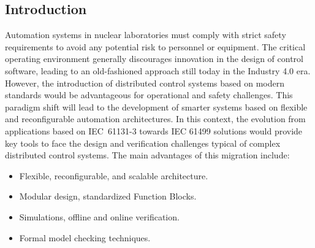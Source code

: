 \begin{bibunit}
\section{Introduction}
\label{sec:introduction}
Automation systems in nuclear laboratories must comply with strict safety requirements to avoid any potential risk to personnel or equipment.
The critical operating environment generally discourages innovation in the design of control software, leading to an old-fashioned approach still today in the Industry 4.0 era. However, the introduction of distributed control systems based on modern standards would be advantageous for operational and safety challenges. This paradigm shift will lead to the development of smarter systems based on flexible and reconfigurable automation architectures. In this context, the evolution from applications based on \mbox{IEC 61131-3} \cite{iec61131-3} towards IEC 61499 \cite{iec61499, zoitl2014} solutions would provide key tools to face the design and verification challenges typical of complex distributed control systems. 
The main advantages of this migration include:

\begin{itemize}
    \item Flexible, reconfigurable, and scalable architecture.
    \item Modular design, standardized Function Blocks.
    \item Simulations, offline and online verification. 
    \item Formal model checking techniques.
\end{itemize}


\end{bibunit}

